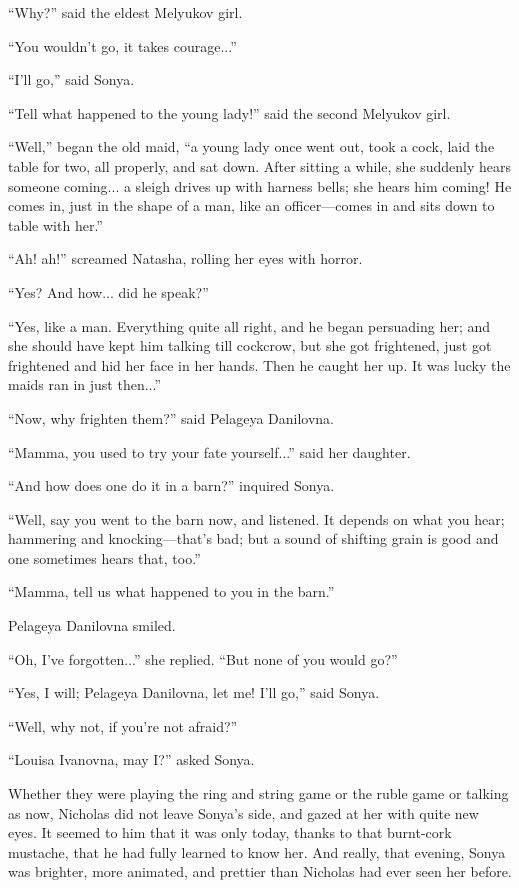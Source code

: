 ``Why?'' said the eldest Melyukov girl.

``You wouldn't go, it takes courage...''

``I'll go,'' said Sonya.

``Tell what happened to the young lady!'' said the second
Melyukov girl.

``Well,'' began the old maid, ``a young lady once went out, took
a cock, laid the table for two, all properly, and sat down. After
sitting a while, she suddenly hears someone coming... a sleigh
drives up with harness bells; she hears him coming! He comes in,
just in the shape of a man, like an officer---comes in and sits
down to table with her.''

``Ah! ah!'' screamed Natasha, rolling her eyes with horror.

``Yes? And how... did he speak?''

``Yes, like a man. Everything quite all right, and he began
persuading her; and she should have kept him talking till
cockcrow, but she got frightened, just got frightened and hid her
face in her hands. Then he caught her up. It was lucky the maids
ran in just then...''

``Now, why frighten them?'' said Pelageya Danilovna.

``Mamma, you used to try your fate yourself...'' said her
daughter.

``And how does one do it in a barn?'' inquired Sonya.

``Well, say you went to the barn now, and listened. It depends on
what you hear; hammering and knocking---that's bad; but a sound
of shifting grain is good and one sometimes hears that, too.''

``Mamma, tell us what happened to you in the barn.''

Pelageya Danilovna smiled.

``Oh, I've forgotten...'' she replied. ``But none of you would
go?''

``Yes, I will; Pelageya Danilovna, let me! I'll go,'' said Sonya.

``Well, why not, if you're not afraid?''

``Louisa Ivanovna, may I?'' asked Sonya.

Whether they were playing the ring and string game or the ruble
game or talking as now, Nicholas did not leave Sonya's side, and
gazed at her with quite new eyes. It seemed to him that it was
only today, thanks to that burnt-cork mustache, that he had fully
learned to know her. And really, that evening, Sonya was
brighter, more animated, and prettier than Nicholas had ever seen
her before.

